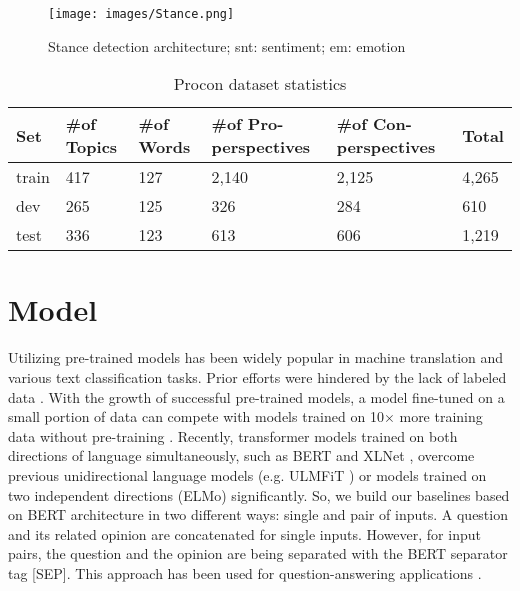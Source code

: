 \documentclass[11pt,a4paper]{article}
\begin{document}
\begin{figure*}
\centering
  \texttt{[image: images/Stance.png]}
    \caption{\label{fig:architecture} Stance detection architecture; snt: sentiment; em: emotion }
    
\end{figure*}

\begin{table*}[t]
  \centering
  
    \begin{tabular}{|l|l|l|l|l|l|}
    \hline
       Set   &  \#of Topics & \#of Words  & \#of Pro-perspectives  & \#of Con-perspectives  & Total \\
    \hline
    train & 417  & 127    &   2,140    & 2,125 &  4,265\\
    dev   & 265 & 125     &  326    &  284 & 610\\
    test  &  336  &123   &   613    & 606 & 1,219\\
    \hline
    \end{tabular}%
  \caption{\label{tab:dataset} Procon dataset statistics}
\end{table*}%



\section{Model}
\label{model}
Utilizing pre-trained models has been widely popular in machine translation and various text classification tasks. Prior efforts were hindered by the lack of labeled data \cite{ZhangHDV19}.
With the growth of successful pre-trained models, a model fine-tuned on a small portion of data can compete with models trained on 10$\times$ more training data without pre-training \cite{howard-ruder-2018-universal}. 
Recently, transformer models trained on both directions of language simultaneously,  such as BERT \cite{devlin-etal-2019-bert} and XLNet \cite{yang2019xlnet}, overcome previous unidirectional language models (e.g. ULMFiT \cite{howard-ruder-2018-universal}) or models trained on  two independent directions (ELMo) \cite{peters-etal-2018-deep} significantly.
So, we build our baselines based on BERT architecture in two different ways: single and pair of inputs. A question and its related opinion are concatenated for single inputs.  However, for input pairs, the question and the opinion are being separated with the BERT separator tag [SEP]. This approach has been used for question-answering applications \cite{devlin-etal-2019-bert}.
\end{document}
